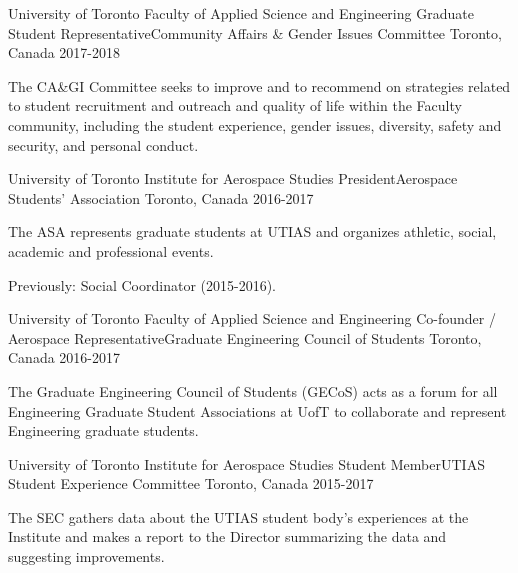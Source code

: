 \begin{cventries}
  \cventry
    {University of Toronto Faculty of Applied Science and Engineering} %
    {Graduate Student Representative{\enskip\cdotp\enskip}Community Affairs \& Gender Issues Committee} %
    {Toronto, Canada} %
    {2017-2018} %
    {
      \begin{cvitems} %
        \item {The CA\&GI Committee seeks to improve and to recommend on strategies related to student recruitment and outreach and quality of life within the Faculty community, including the student experience, gender issues, diversity, safety and security, and personal conduct.}
      \end{cvitems}
    }

  \cventry
    {University of Toronto Institute for Aerospace Studies} %
    {President{\enskip\cdotp\enskip}Aerospace Students' Association} %
    {Toronto, Canada} %
    {2016-2017} %
    {
      \begin{cvitems} %
        \item {The ASA represents graduate students at UTIAS and organizes athletic, social, academic and professional events.}
        \item{Previously: Social Coordinator (2015-2016).}
      \end{cvitems}
    }
  
  \cventry
    {University of Toronto Faculty of Applied Science and Engineering} %
    {Co-founder / Aerospace Representative{\enskip\cdotp\enskip}Graduate Engineering Council of Students} %
    {Toronto, Canada} %
    {2016-2017} %
    {
      \begin{cvitems} %
        \item {The Graduate Engineering Council of Students (GECoS) acts as a forum for all Engineering Graduate Student Associations at UofT to collaborate and represent Engineering graduate students.}
      \end{cvitems}
    }

  \cventry
    {University of Toronto Institute for Aerospace Studies} %
    {Student Member{\enskip\cdotp\enskip}UTIAS Student Experience Committee} %
    {Toronto, Canada} %
    {2015-2017} %
    {
      \begin{cvitems} %
        \item {The SEC gathers data about the UTIAS student body's experiences at the Institute and makes a report to the Director summarizing the data and suggesting improvements.}
      \end{cvitems}
    }


\end{cventries}
